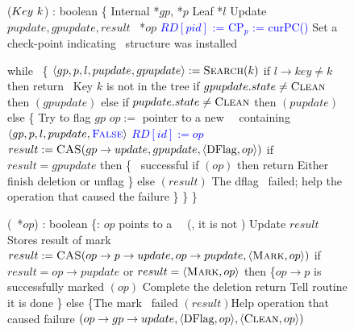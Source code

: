 \begin{figure}[H]
	\scriptsize
	\begin{code}
		\firstline
		($Key\ k$) : boolean \{\nlc
		\n Internal *$gp$, *$p$ \label{BSTDelete-entry} \nlc
		Leaf *$l$\nlc
		Update $pupdate, gpupdate, result$\nlc
		\DFlag\ *$op$\bl\nlc
		\textcolor{blue} {$RD[pid]$ := \init} \nlc
		\textcolor{blue} {$\text{CP}_p$ := curPC()}  \tabtabcom Set a check-point indicating \IFlag\ structure was installed \label{BSTdelete-set-checkpoint} \nlc
		
		while \TRUE\ \{ \nlc
		\n     $\langle gp, p, l, pupdate, gpupdate \rangle := \mbox{\sc Search}(k)$\label{del-search}\nlc
		if $l\rightarrow key \neq k$ then return \FALSE\ \tabtabcom Key $k$ is not in the tree\label{delete-false}\nlc
		if $gpupdate.state \neq \mbox{\sc Clean}$ then $(gpupdate)$ \label{del-help-unclean-1}\nlc
		else if $pupdate.state \neq \mbox{\sc Clean}$ then $(pupdate)$\label{del-help-unclean-2}\nlc
		else \{ \tabtabcom Try to flag $gp$\nlc
		\n          $op :=$ pointer to a new \DFlag\ \record\  containing $\langle gp, p, l, pupdate, \textcolor{blue}{\mbox{\sc False}} \rangle$\label{new-DFlag}\nlc
		\textcolor{blue}{$RD[id] := op$} \nlc
		$result := \mbox{\sc CAS}(gp\rightarrow update, gpupdate, \langle \mbox{DFlag}, op \rangle)$ \label{dflag-cas}\nlc
		if $result = gpupdate$ then \{ \tabtabcom \CASB\ successful \nlc
		\n             if $(op)$ then return \TRUE \label{delete-true} \tabtabcom Either finish deletion or unflag\nlc
		\p          \}\nlc                 
		else $(result)$ \tabcom The dflag \CASB\ failed; help the operation that caused the failure \label{del-help-after-failure}\nlc%
		\p     \}\nlc
		\p \}\nlc
		\p
		\}\bl
		\nlc
		
		(\DFlag\ *$op$) : boolean \{\ul
		\n   {}:  $op$ points to a \DFlag\ \record\  (\ie, it is not \NULL)\nlc%
		Update $result$ \tabtabcom Stores result of mark \CASB\bl\nlc
		$result := \mbox{\sc CAS}(op\rightarrow p\rightarrow update, op\rightarrow pupdate, \langle \mbox{\sc Mark}, op\rangle)$ \label{mark-cas}\nlc     
		if $result = op\rightarrow pupdate$ or $result = \langle \mbox{\sc Mark}, op\rangle$ then \label{checkmark}\{\tabtabcom $op\rightarrow p$ is successfully marked\nlc
		\n          {}$(op)$ \label{call-hm1} \tabtabcom Complete the deletion\nlc
		return \TRUE\tabtabcom Tell  routine it is done\nlc
		\p       \}\nlc
		else \{\tabtabcom The mark \CASB\ failed \nlc
		\n              
		$(result)$\label{help-after-failed-mark}\tabtabcom Help operation that caused failure\nlc
		\CASB$(op\rightarrow gp\rightarrow update, \langle \mbox{DFlag}, op\rangle, \langle \mbox{\sc Clean}, op\rangle)$ \label{backtrack-cas}\nlc
		

\end{code}
\end{figure}
